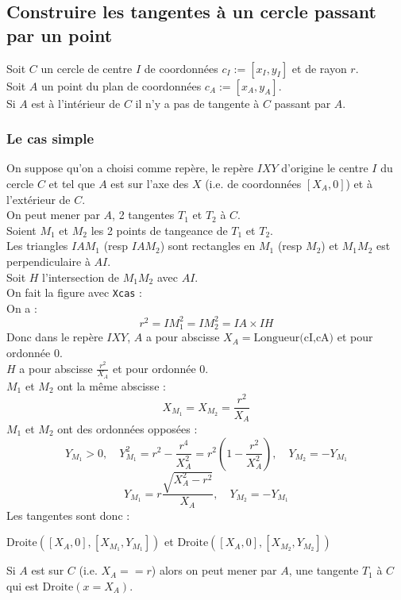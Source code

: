 \documentclass[12pt,a4paper]{book}
\begin{document}
\begin{giacjshere}
\subsection{Construire les tangentes \`a un cercle passant par un point}
Soit $ C$ un cercle de centre $ I$ de coordonn\'ees 
$ c_I:=[x_I,y_I]$ et de rayon $ r$.\\
Soit $ A$ un point du plan de coordonn\'ees $ c_A:=[x_A,y_A]$.\\
Si $ A$ est \`a l'int\'erieur de $ C$ il n'y a pas de tangente \`a $ C$
passant par $ A$.

\subsubsection{Le cas simple}
On suppose qu'on a choisi comme rep\`ere, le rep\`ere $IXY$
d'origine le centre $ I$ du cercle $C$  et
tel que $A$ est sur l'axe des $X$ (i.e. de coordonn\'ees $[X_A,0]$) et 
\`a l'ext\'erieur de $C$.\\
On peut mener par $A$, 2 tangentes $ T_1$ et $ T_2$ \`a $ C$.\\
Soient $ M_1$ et $ M_2$ les 2 points de tangeance de $ T_1$ et $ T_2$.\\
Les triangles $ IAM_1$ (resp $ IAM_2$) sont rectangles en $ M_1$ 
(resp $ M_2$) et $ M_1M_2$ est perpendiculaire \`a $ AI$.\\
Soit $ H$ l'intersection de $ M_1M_2$ avec $ AI$.\\
On fait la figure avec {\tt Xcas} :\\
On a :
$$ r^2=IM_1^2=IM_2^2=IA \times IH$$
Donc dans le rep\`ere $IXY$, 
$A$ a pour abscisse $X_A=\mbox{Longueur(cI,cA)}$ et pour ordonn\'ee 0.\\
$H$ a pour abscisse $\frac{r^2}{X_A}$ et pour ordonn\'ee 0.\\
$ M_1$ et $ M_2$ ont la m\^eme  abscisse :
$$ X_{M_1}=X_{M_2}=\frac{r^2}{X_A}$$
$ M_1$ et $ M_2$ ont des ordonn\'ees oppos\'ees :\\
$$Y_{M_1}>0,\quad Y_{M_1}^2=r^2-\frac{r^4}{X_A^2}=r^2(1-\frac{r^2}{X_A^2}), \quad Y_{M_2}=-Y_{M_1}$$
$$ Y_{M_1}=r\frac{\sqrt{X_A^2-r^2}}{X_A}, \quad Y_{M_2}=-Y_{M_1} $$
Les tangentes sont donc :
\begin{center}
$ \mbox{Droite}([X_A,0], [X_{M_1},Y_{M_1}])$ et $ \mbox{Droite}([X_A,0], [X_{M_2},Y_{M_2}])$
\end{center}
Si $ A$ est sur $ C$ (i.e. $ X_A==r$) alors on peut mener par $ A $,
 une tangente $ T_1$ \`a $ C$ qui est $ \mbox{Droite}(x=X_A)$.


\end{giacjshere}
\end{document}
